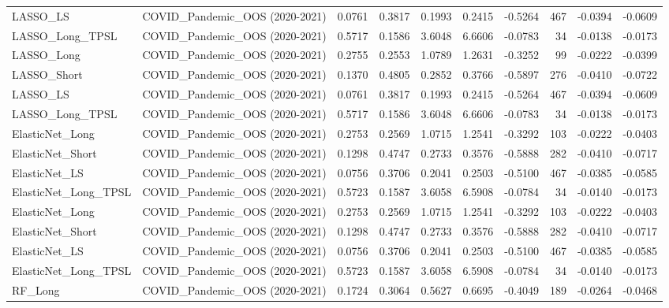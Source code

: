 \begin{tabular}{llrrrrrrrr}
\cline{1-10}
LASSO\_LS & COVID\_Pandemic\_OOS (2020-2021) & 0.0761 & 0.3817 & 0.1993 & 0.2415 & -0.5264 & 467 & -0.0394 & -0.0609 \\
\cline{1-10}
LASSO\_Long\_TPSL & COVID\_Pandemic\_OOS (2020-2021) & 0.5717 & 0.1586 & 3.6048 & 6.6606 & -0.0783 & 34 & -0.0138 & -0.0173 \\
\cline{1-10}
LASSO\_Long & COVID\_Pandemic\_OOS (2020-2021) & 0.2755 & 0.2553 & 1.0789 & 1.2631 & -0.3252 & 99 & -0.0222 & -0.0399 \\
\cline{1-10}
LASSO\_Short & COVID\_Pandemic\_OOS (2020-2021) & 0.1370 & 0.4805 & 0.2852 & 0.3766 & -0.5897 & 276 & -0.0410 & -0.0722 \\
\cline{1-10}
LASSO\_LS & COVID\_Pandemic\_OOS (2020-2021) & 0.0761 & 0.3817 & 0.1993 & 0.2415 & -0.5264 & 467 & -0.0394 & -0.0609 \\
\cline{1-10}
LASSO\_Long\_TPSL & COVID\_Pandemic\_OOS (2020-2021) & 0.5717 & 0.1586 & 3.6048 & 6.6606 & -0.0783 & 34 & -0.0138 & -0.0173 \\
\cline{1-10}
ElasticNet\_Long & COVID\_Pandemic\_OOS (2020-2021) & 0.2753 & 0.2569 & 1.0715 & 1.2541 & -0.3292 & 103 & -0.0222 & -0.0403 \\
\cline{1-10}
ElasticNet\_Short & COVID\_Pandemic\_OOS (2020-2021) & 0.1298 & 0.4747 & 0.2733 & 0.3576 & -0.5888 & 282 & -0.0410 & -0.0717 \\
\cline{1-10}
ElasticNet\_LS & COVID\_Pandemic\_OOS (2020-2021) & 0.0756 & 0.3706 & 0.2041 & 0.2503 & -0.5100 & 467 & -0.0385 & -0.0585 \\
\cline{1-10}
ElasticNet\_Long\_TPSL & COVID\_Pandemic\_OOS (2020-2021) & 0.5723 & 0.1587 & 3.6058 & 6.5908 & -0.0784 & 34 & -0.0140 & -0.0173 \\
\cline{1-10}
ElasticNet\_Long & COVID\_Pandemic\_OOS (2020-2021) & 0.2753 & 0.2569 & 1.0715 & 1.2541 & -0.3292 & 103 & -0.0222 & -0.0403 \\
\cline{1-10}
ElasticNet\_Short & COVID\_Pandemic\_OOS (2020-2021) & 0.1298 & 0.4747 & 0.2733 & 0.3576 & -0.5888 & 282 & -0.0410 & -0.0717 \\
\cline{1-10}
ElasticNet\_LS & COVID\_Pandemic\_OOS (2020-2021) & 0.0756 & 0.3706 & 0.2041 & 0.2503 & -0.5100 & 467 & -0.0385 & -0.0585 \\
\cline{1-10}
ElasticNet\_Long\_TPSL & COVID\_Pandemic\_OOS (2020-2021) & 0.5723 & 0.1587 & 3.6058 & 6.5908 & -0.0784 & 34 & -0.0140 & -0.0173 \\
\cline{1-10}
RF\_Long & COVID\_Pandemic\_OOS (2020-2021) & 0.1724 & 0.3064 & 0.5627 & 0.6695 & -0.4049 & 189 & -0.0264 & -0.0468 \\

\end{tabular}
